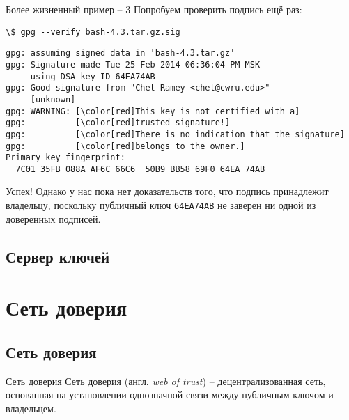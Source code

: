 \documentclass[presentation]{beamer}
\begin{document}
\begin{frame}[fragile]{Более жизненный пример -- 3}
  Попробуем проверить подпись ещё раз:
  \begin{Verbatim}[commandchars=\\\[\]]
\$ gpg --verify bash-4.3.tar.gz.sig
  \end{Verbatim}
  \footnotesize
  \begin{Verbatim}[commandchars=\\\[\]]
gpg: assuming signed data in 'bash-4.3.tar.gz'
gpg: Signature made Tue 25 Feb 2014 06:36:04 PM MSK
     using DSA key ID 64EA74AB
gpg: Good signature from "Chet Ramey <chet@cwru.edu>"
     [unknown]
gpg: WARNING: [\color[red]This key is not certified with a]
gpg:          [\color[red]trusted signature!]
gpg:          [\color[red]There is no indication that the signature]
gpg:          [\color[red]belongs to the owner.]
Primary key fingerprint:
  7C01 35FB 088A AF6C 66C6  50B9 BB58 69F0 64EA 74AB
  \end{Verbatim}
  \normalsize

  \vspace{5 mm}

  Успех!  Однако у нас пока нет доказательств того, что подпись
  принадлежит владельцу, поскольку публичный ключ \texttt{64EA74AB} не
  заверен ни одной из доверенных подписей.
\end{frame}



\subsection{Сервер ключей}





\section{Сеть доверия}

\subsection{Сеть доверия}

\begin{frame}{Сеть доверия}
  \raisebox{-.30em}{\Large\HandRight}\hspace{.25em} Сеть доверия
  (англ. \emph{web of trust}) -- децентрализованная сеть, основанная
  на установлении однозначной связи между публичным ключом и
  владельцем.
\end{frame}
\end{document}
